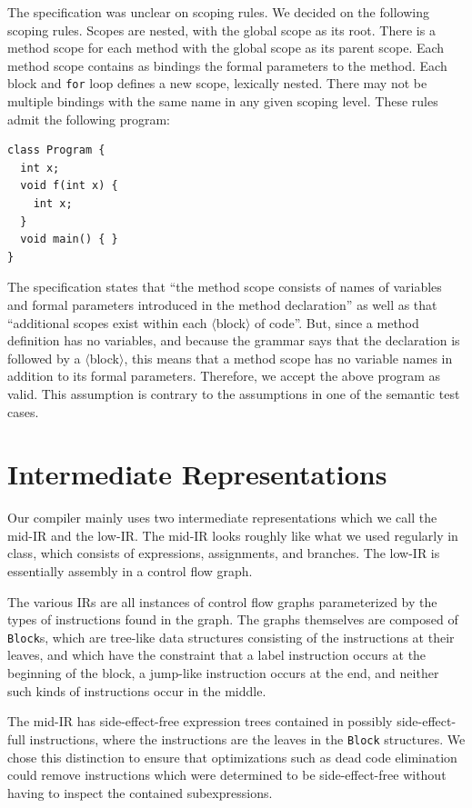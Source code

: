 \documentclass[11pt]{article}
\begin{document}
The specification was unclear on scoping rules.  We decided on the
following scoping rules.  Scopes are nested, with the global scope as
its root.  There is a method scope for each method with the global
scope as its parent scope.  Each method scope contains as bindings the
formal parameters to the method.  Each block and \texttt{for} loop
defines a new scope, lexically nested.  There may not be multiple
bindings with the same name in any given scoping level.  These rules
admit the following program:
\begin{verbatim}
class Program {
  int x;
  void f(int x) {
    int x;
  }
  void main() { }
}
\end{verbatim}
The specification states that ``the method scope consists of names of
variables and formal parameters introduced in the method declaration''
as well as that ``additional scopes exist within each
$\langle$block$\rangle$ of code''.  But, since a method definition has
no variables, and because the grammar says that the declaration is
followed by a $\langle$block$\rangle$, this means that a method scope
has no variable names in addition to its formal parameters.
Therefore, we accept the above program as valid.  This assumption is
contrary to the assumptions in one of the semantic test cases.

\section{Intermediate Representations}

Our compiler mainly uses two intermediate representations which we
call the mid-IR and the low-IR.  The mid-IR looks roughly like what we
used regularly in class, which consists of expressions, assignments,
and branches. The low-IR is essentially assembly in a control flow
graph.

The various IRs are all instances of control flow graphs parameterized
by the types of instructions found in the graph.  The graphs
themselves are composed of \texttt{Block}s, which are tree-like data
structures consisting of the instructions at their leaves, and which
have the constraint that a label instruction occurs at the beginning
of the block, a jump-like instruction occurs at the end, and neither
such kinds of instructions occur in the middle.

The mid-IR has side-effect-free expression trees contained in possibly
side-effect-full instructions, where the instructions are the leaves
in the \texttt{Block} structures.  We chose this distinction to ensure
that optimizations such as dead code elimination could remove
instructions which were determined to be side-effect-free without
having to inspect the contained subexpressions.
\end{document}
